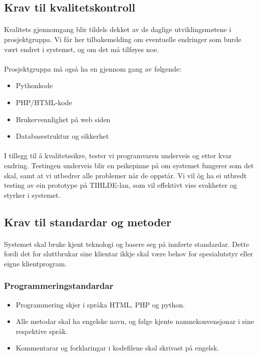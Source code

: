 \documentclass[nynorsk,12pt,a4paper]{article}
\begin{document}
\subsection{Krav til kvalitetskontroll}
\paragraph{}
Kvalitets gjennomgang blir tildels dekket av de daglige utviklingsmøtene i prosjektgruppa. Vi får her tilbakemelding om eventuelle endringer som burde vært endret i systemet, og om det må tilføyes noe. 

\paragraph{}
Prosjektgruppa må også ha en gjennom gang av følgende:
\begin{itemize}
	\item Pythonkode
	\item PHP/HTML-kode
	\item Brukervennlighet på web siden
	\item Databasestruktur og sikkerhet
\end{itemize}

\paragraph{}
I tillegg til å kvalitetssikre, tester vi programvaren underveis og etter kvar endring. Testingen underveis blir en peikepinne på om systemet fungerer som det skal, samt at vi utbedrer alle problemer når de oppstår. Vi vil òg ha ei utbredt testing av ein prototype på TIHLDE{}-lan, som vil effektivt vise svakheter og styrker i systemet.

\subsection{Krav til standardar og metoder}
\paragraph{}
Systemet skal bruke kjent teknologi og basere seg på innførte standardar. Dette fordi det for sluttbrukar sine klientar ikkje skal være behov for spesialutstyr eller eigne klientprogram. 

\subsubsection{Programmeringstandardar}
\begin{itemize}
	\item Programmering skjer i språka HTML, PHP og python.
	\item Alle metodar skal ha engelske navn, og følge kjente namnekonvensjonar i sine respektive språk.
	\item Kommentarar og forklaringar i kodefilene skal skrivast på engelsk.
\end{itemize}
\end{document}
